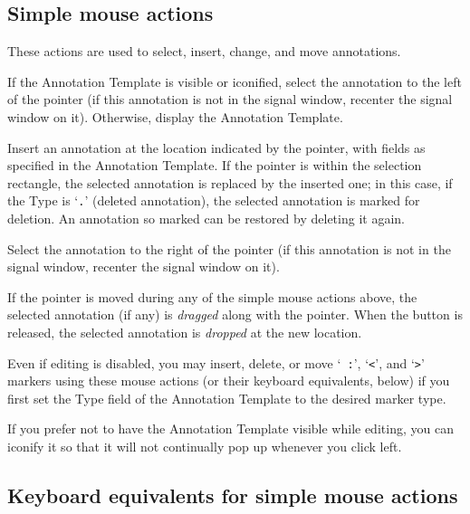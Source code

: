 \documentclass[twoside]{book}
\begin{document}
\subsection*{Simple mouse actions}

These actions are used to select, insert, change, and move annotations.

\begin{description}
\item[left mouse button click]
If the {\sf Annotation Template} is visible or iconified, select the
annotation to the left of the pointer (if this annotation is not in
the signal window, recenter the signal window on it).  Otherwise,
display the {\sf Annotation Template}.

\item[middle mouse button click]
Insert an annotation at the location indicated by the pointer, with fields as
specified in the {\sf Annotation Template}.  If the pointer is within
the selection rectangle, the selected annotation is replaced by the
inserted one;  in this case, if the {\sf Type} is `{\tt .}' (deleted
annotation), the selected annotation is marked for deletion.  An
annotation so marked can be restored by deleting it again.

\item[right mouse button click]
Select the annotation to the right of the pointer (if this annotation
is not in the signal window, recenter the signal window on it).
\end{description}

If the pointer is moved during any of the simple mouse actions above, the
selected annotation (if any) is \emph{dragged} along with the pointer.
When the button is released, the selected annotation is \emph{dropped}
at the new location.

Even if editing is disabled, you may insert, delete, or move `{\tt
:}', `{\tt <}', and `{\tt >}' markers using these mouse actions (or
their keyboard equivalents, below) if you first set the {\sf Type}
field of the {\sf Annotation Template} to the desired marker type.

If you prefer not to have the {\sf Annotation Template} visible while
editing, you can iconify it so that it will not continually pop up
whenever you click left.

\subsection*{Keyboard equivalents for simple mouse actions}
\end{document}
